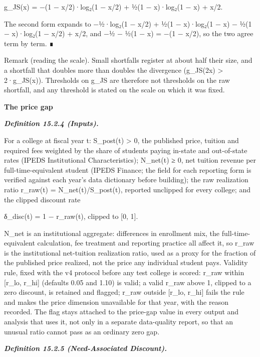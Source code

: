 \documentclass[
]{article}
\begin{document}
g\_JS(x) = −(1 − x/2)·log₂(1 − x/2) + ½(1 − x)·log₂(1 − x) + x/2.

The second form expands to −½·log₂(1 − x/2) + ½(1 − x)·log₂(1 − x) − ½(1
− x)·log₂(1 − x/2) + x/2, and −½ − ½(1 − x) = −(1 − x/2), so the two
agree term by term. ∎

Remark (reading the scale). Small shortfalls register at about half
their size, and a shortfall that doubles more than doubles the
divergence (g\_JS(2x) \textgreater{} 2·g\_JS(x)). Thresholds on g\_JS
are therefore not thresholds on the raw shortfall, and any threshold is
stated on the scale on which it was fixed.

\textbf{The price gap}

\emph{\textbf{Definition 15.2.4 (Inputs).}}

For a college at fiscal year t: S\_post(t) \textgreater{} 0, the
published price, tuition and required fees weighted by the share of
students paying in-state and out-of-state rates (IPEDS Institutional
Characteristics); N\_net(t) ≥ 0, net tuition revenue per
full-time-equivalent student (IPEDS Finance; the field for each
reporting form is verified against each year's data dictionary before
building); the raw realization ratio r\_raw(t) = N\_net(t)/S\_post(t),
reported unclipped for every college; and the clipped discount rate

δ\_disc(t) = 1 − r\_raw(t), clipped to {[}0, 1{]}.

N\_net is an institutional aggregate: differences in enrollment mix, the
full-time-equivalent calculation, fee treatment and reporting practice
all affect it, so r\_raw is the institutional net-tuition realization
ratio, used as a proxy for the fraction of the published price realized,
not the price any individual student pays. Validity rule, fixed with the
v4 protocol before any test college is scored: r\_raw within {[}r\_lo,
r\_hi{]} (defaults 0.05 and 1.10) is valid; a valid r\_raw above 1,
clipped to a zero discount, is retained and flagged; r\_raw outside
{[}r\_lo, r\_hi{]} fails the rule and makes the price dimension
unavailable for that year, with the reason recorded. The flag stays
attached to the price-gap value in every output and analysis that uses
it, not only in a separate data-quality report, so that an unusual ratio
cannot pass as an ordinary zero gap.

\emph{\textbf{Definition 15.2.5 (Need-Associated Discount).}}
\end{document}
